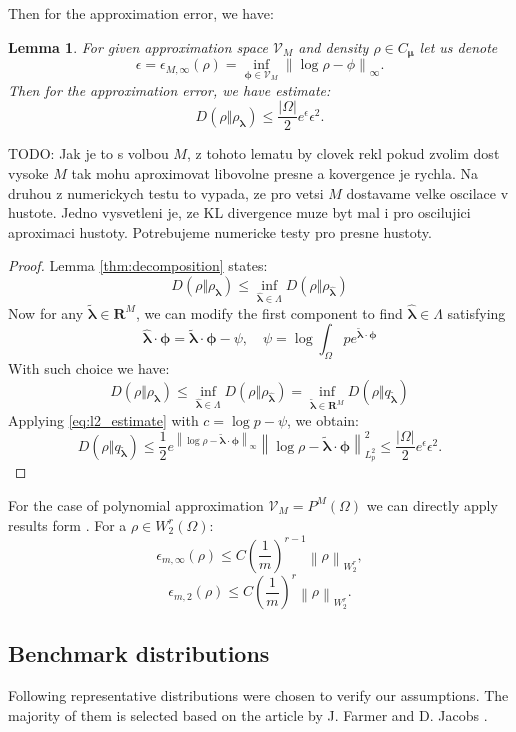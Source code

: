 \documentclass{article}
\newtheorem{lemma}[theorem]{Lemma}
\def\vc#1{\mathbf{\boldsymbol{#1}}}     %
\newcommand{\norm}[1]{\left\lVert#1\right\rVert}
\def\todo#1{{\color{red}TODO: #1}}
\def\R{\mathbf{R}}
\def\abs#1{|#1|}
\def\vl{{\vc\lambda}}
\def\estvl{{\vc{\hat\lambda}}}
\def\vmu{\vc\mu}
\def\vphi{\vc\phi}
\begin{document}
Then for the approximation error, we have:
\begin{lemma}
\label{thm:approx_error}
For given approximation space $\mathcal V_M$ and density $\rho\in C_{\vmu}$ let us denote
\[
  \epsilon = \epsilon_{M,\infty}(\rho) = \inf_{\vphi \in \mathcal V_M} \norm{\log \rho - \phi}_\infty.
\]
Then for the approximation error, we have estimate:
\[
D(\rho\Vert\rho_{\vl})  \le \frac{\abs{\Omega}}{2} e^{\epsilon} \epsilon^2.
\]
\end{lemma}
\todo{Jak je to s volbou $M$, z tohoto lematu by clovek rekl pokud zvolim dost vysoke $M$ tak mohu aproximovat libovolne presne a kovergence je rychla. Na druhou z numerickych testu to vypada, ze pro vetsi $M$ dostavame velke oscilace v hustote. Jedno vysvetleni je, ze KL divergence muze byt mal i pro oscilujici aproximaci hustoty. Potrebujeme numericke testy pro presne hustoty.} 
\begin{proof}
Lemma \ref{thm:decomposition} states:
\[
D(\rho\Vert\rho_{\vl}) \le \inf_{\estvl \in \Lambda} D(\rho\Vert\rho_{\estvl})
\]
Now for any $\vc{\tilde\lambda} \in \R^M$, we can modify the first component to find $\estvl \in \Lambda$ satisfying
\[
  \estvl \cdot \vphi = \vc{\tilde\lambda} \cdot \vphi - \psi, \quad \psi 
                             = \log \int_\Omega p e^{\widetilde{\vc\lambda}\cdot \vc \phi}
\]
With such choice we have:
\[
D(\rho\Vert\rho_{\vl}) \le \inf_{\estvl \in \Lambda} D(\rho\Vert\rho_{\estvl})
=\inf_{\vc{\tilde\lambda} \in \R^M} D(\rho\Vert q_{\vc{\tilde\lambda}})
\]
Applying \eqref{eq:l2_estimate} with $c = \log p - \psi$, we obtain:
\[
  D(\rho\Vert q_{\vc{\tilde\lambda}}) \le 
  \frac{1}{2}
  e^{\norm{\log \rho - \vc{\tilde\lambda}\cdot \vc \phi}_\infty} 
    \norm{\log \rho - \vc{\tilde\lambda}\cdot \vc \phi}_{L^2_p}^2
  \le \frac{\abs{\Omega}}{2} e^{\epsilon} \epsilon^2.
\]
\end{proof}
For the case of polynomial approximation $\mathcal V_M = P^M(\Omega)$ we can directly apply results form \cite[Section 7]{Barron1991}. For a $\rho \in W^r_2(\Omega)$:
\[
    \epsilon_{m,\infty}(\rho) \le C \left(\frac{1}{m}\right)^{r-1} \norm{\rho}_{W^r_2},
\]
\[
    \epsilon_{m,2}(\rho) \le C \left(\frac{1}{m}\right)^{r}\norm{\rho}_{W^r_2}.
\]

\subsection{Benchmark distributions}

Following representative distributions were chosen to verify our assumptions. The majority of them is selected based on the article by J. Farmer and D. Jacobs \cite{Farmer2018511}.
\end{document}
